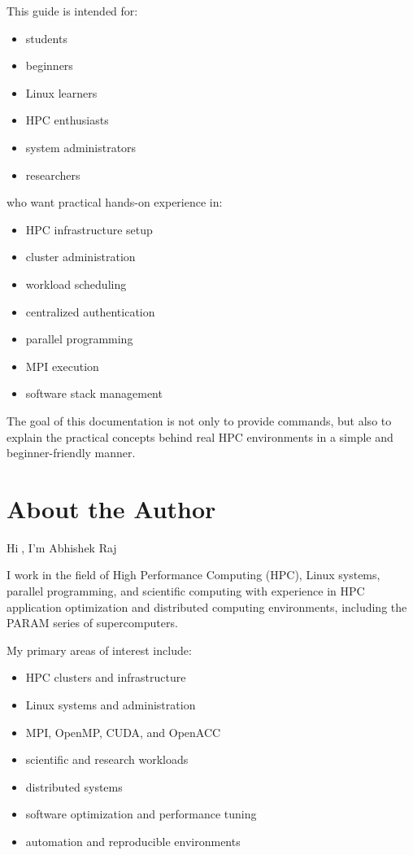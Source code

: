\documentclass[11pt]{article}
\begin{document}
This guide is intended for:

\begin{itemize}
\item students
\item beginners
\item Linux learners
\item HPC enthusiasts
\item system administrators
\item researchers
\end{itemize}

who want practical hands-on experience in:

\begin{itemize}
\item HPC infrastructure setup
\item cluster administration
\item workload scheduling
\item centralized authentication
\item parallel programming
\item MPI execution
\item software stack management
\end{itemize}

The goal of this documentation is not only to provide commands, but
also to explain the practical concepts behind real HPC environments in a
simple and beginner-friendly manner.
\section{About the Author}
\label{sec:org18b6424}

Hi👋, I'm Abhishek Raj

I work in the field of High Performance Computing (HPC), Linux systems,
parallel programming, and scientific computing with experience in HPC
application optimization and distributed computing environments,
including the PARAM series of supercomputers.

My primary areas of interest include:

\begin{itemize}
\item HPC clusters and infrastructure
\item Linux systems and administration
\item MPI, OpenMP, CUDA, and OpenACC
\item scientific and research workloads
\item distributed systems
\item software optimization and performance tuning
\item automation and reproducible environments
\end{itemize}
\end{document}
